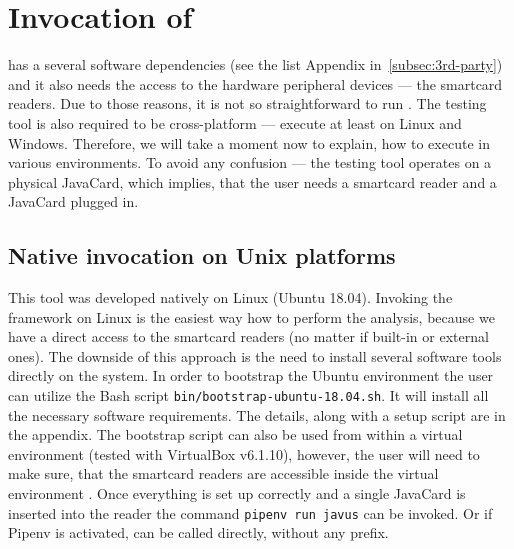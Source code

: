 



    \section{Invocation of \javus}\label{sec:invocation}
        \projectname has a several software dependencies (see the list Appendix in~\ref{subsec:3rd-party}) and it also needs the access to the hardware peripheral devices --- the smartcard readers. Due to those reasons, it is not so straightforward to run \javus. The testing tool is also required to be cross-platform --- execute at least on Linux and Windows. Therefore, we will take a moment now to explain, how to execute \javus in various environments. To avoid any confusion --- the testing tool operates on a physical JavaCard, which implies, that the user needs a smartcard reader and a JavaCard plugged in.

        \subsection{Native invocation on Unix platforms}\label{subsec:native-invocation}
        This tool was developed natively on Linux (Ubuntu 18.04). Invoking the framework on Linux is the easiest way how to perform the analysis, because we have a direct access to the smartcard readers (no matter if built-in or external ones). The downside of this approach is the need to install several software tools directly on the system. In order to bootstrap the Ubuntu environment the user can utilize the Bash script \texttt{bin/bootstrap-ubuntu-18.04.sh}. It will install all the necessary software requirements. The details, along with a setup script are in the appendix. The bootstrap script can also be used from within a virtual environment (tested with VirtualBox v6.1.10), however, the user will need to make sure, that the smartcard readers are accessible inside the virtual environment . Once everything is set up correctly and a single JavaCard is inserted  into the reader the command \texttt{pipenv run javus} can be invoked. Or if Pipenv is activated, \javus can be called directly, without any prefix.

